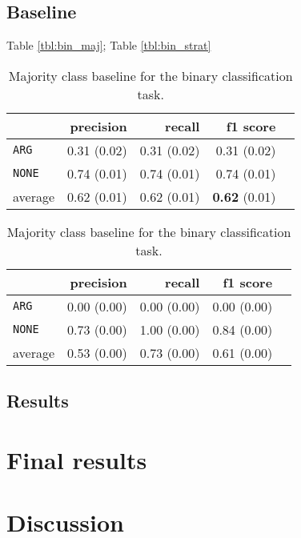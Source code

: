 \subsection{Baseline}
Table \ref{tbl:bin_maj}; Table \ref{tbl:bin_strat}


\begin{table}[!htb]
    \begin{minipage}{.5\linewidth}
      \caption{Random (stratified) baseline for the binary classification task.}
      \label{foo}
      \centering
      
\begin{tabular}{@{}lrrrr@{}}
\toprule
 	&	 precision &	 recall &	 f1 score  \\ \midrule 
\texttt{ARG}	&	 0.31 \scriptsize{(0.02)} &	 0.31 \scriptsize{(0.02)} &	 0.31 \scriptsize{(0.02)}  \\ 
\texttt{NONE}	&	 0.74 \scriptsize{(0.01)} &	 0.74 \scriptsize{(0.01)} &	 0.74 \scriptsize{(0.01)}  \\ 
average	&	 0.62 \scriptsize{(0.01)} &	 0.62 \scriptsize{(0.01)} &	 \textbf{0.62} \scriptsize{(0.01)}  \\ 
\bottomrule
\end{tabular}

  \end{minipage}%
    \begin{minipage}{.5\linewidth}
      \centering
        \caption{Majority class baseline for the binary classification task.}
\begin{tabular}{@{}lrrrr@{}}
\toprule
 	&	 precision &	 recall &	 f1 score  \\ \midrule 
\texttt{ARG}	&	 0.00 \scriptsize{(0.00)} &	 0.00 \scriptsize{(0.00)} &	 0.00 \scriptsize{(0.00)}  \\ 
\texttt{NONE}	&	 0.73 \scriptsize{(0.00)} &	 1.00 \scriptsize{(0.00)} &	 0.84 \scriptsize{(0.00)}  \\ 
average	&	 0.53 \scriptsize{(0.00)} &	 0.73 \scriptsize{(0.00)} &	 0.61 \scriptsize{(0.00)}  \\ 
\bottomrule
\end{tabular}
    \end{minipage} 
\end{table}







\subsection{Results}

\section{Final results}
\label{sec:final}

\section{Discussion}